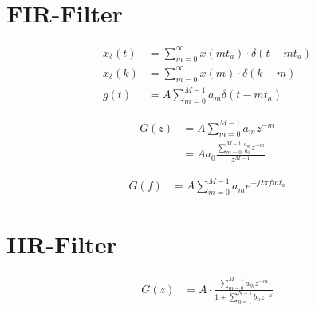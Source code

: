 \section{FIR-Filter}

\begin{boxleft}
\end{boxleft}\begin{boxrightshaded}
\begin{align*}
x_\delta\left(t\right)&=\sum\limits_{m=0}^\infty x\left(mt_a\right)\cdot \delta\left(t-mt_a\right)\\
x_\delta\left(k\right)&=\sum\limits_{m=0}^\infty x\left(m\right)\cdot \delta\left(k-m\right)\\
g\left(t\right)&=A\sum\limits_{m=0}^{M-1}a_m\delta \left(t-mt_a\right)
\end{align*}
\end{boxrightshaded}

\begin{boxleft}
\end{boxleft}\begin{boxrightshaded}
\begin{align*}
G\left(z\right)&=A\sum\limits_{m=0}^{M-1}a_mz^{-m}\\
&=Aa_0\frac{\sum\limits_{m=0}^{M-1}\frac{a_m}{a_0}z^{-m}}{z^{M-1}}
\end{align*}
\end{boxrightshaded}

\begin{boxleft}
\end{boxleft}\begin{boxrightshaded}
\begin{align*}
G\left(f\right)&=A\sum\limits_{m=0}^{M-1}a_me^{-j2\pi fmt_a}
\end{align*}
\end{boxrightshaded}


\section{IIR-Filter}

\begin{boxleft}
\end{boxleft}\begin{boxrightshaded}
\begin{align*}
G\left(z\right)&=A\cdot\frac{\sum\limits_{m=0}^{M-1}a_mz^{-m}}{1+\sum\limits_{n=1}^{N-1}b_nz^{-n}}
\end{align*}
\end{boxrightshaded}

